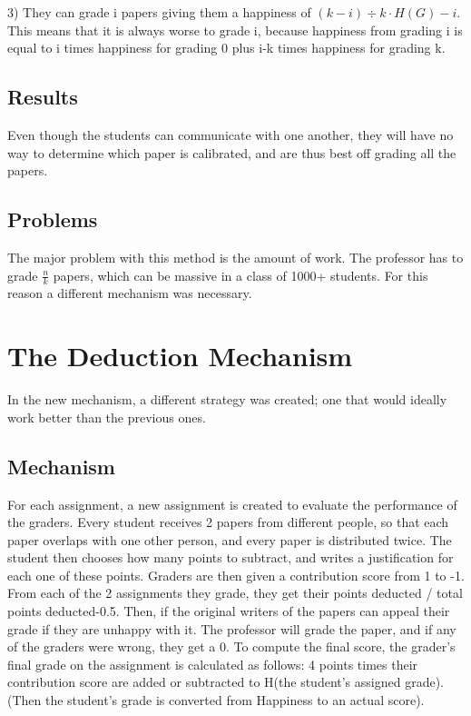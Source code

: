 \documentclass[12pt, Arial]{article}
\begin{document}
3) They can grade i papers giving them a happiness of $(k-i)\div k \cdot H(G)-i$. This means that it is always worse to grade i, because happiness from grading i is equal to i times happiness for grading 0 plus i-k times happiness for grading k.

\subsection{Results}
Even though the students can communicate with one another, they will have no way to determine which paper is calibrated, and are thus best off grading all the papers.

\subsection{Problems}
The major problem with this method is the amount of work. The professor has to grade $\frac{n}{k}$ papers, which can be massive in a class of 1000+ students. For this reason a different mechanism was necessary.

\section{The Deduction Mechanism}
In the new mechanism, a different strategy was created; one that would ideally work better than the previous ones.

\subsection{Mechanism}
For each assignment, a new assignment is created to evaluate the performance of the graders. Every student receives 2 papers from different people, so that each paper overlaps with one other person, and every paper is distributed twice. The student then chooses how many points to subtract, and writes a justification for each one of these points. Graders are then given a contribution score from 1 to -1. From each of the 2 assignments they grade, they get their points deducted / total points deducted-0.5. Then, if the original writers of the papers can appeal their grade if they are unhappy with it. The professor will grade the paper, and if any of the graders were wrong, they get a 0. To compute the final score, the grader's final grade on the assignment is calculated as follows: 4 points times their contribution score are added or subtracted to H(the student's assigned grade). (Then the student's grade is converted from Happiness to an actual score).
\end{document}
